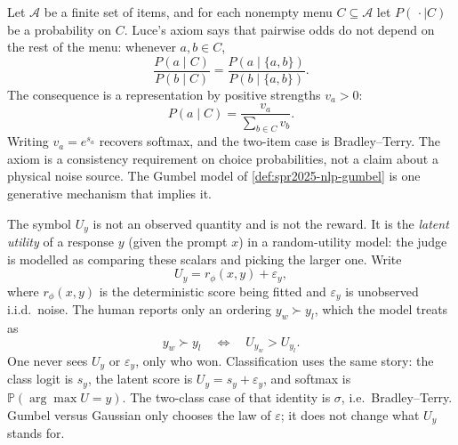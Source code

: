 \documentclass[11pt,a4paper]{article}
\theoremstyle{definition}
\begin{document}
\begin{definition}\label{def:spr2025-nlp-luce}
Let \(\mathcal{A}\) be a finite set of items, and for each nonempty menu \(C\subseteq\mathcal{A}\) let \(P(\,\cdot\mid C)\) be a probability on \(C\). Luce's axiom says that pairwise odds do not depend on the rest of the menu: whenever \(a,b\in C\),
\[
\frac{P(a\mid C)}{P(b\mid C)}
=\frac{P(a\mid\{a,b\})}{P(b\mid\{a,b\})}.
\]
The consequence is a representation by positive strengths \(v_a>0\):
\[
P(a\mid C)
=\frac{v_a}{\sum_{b\in C}v_b}.
\]
Writing \(v_a=e^{s_a}\) recovers softmax, and the two-item case is Bradley--Terry. The axiom is a consistency requirement on choice probabilities, not a claim about a physical noise source. The Gumbel model of \cref{def:spr2025-nlp-gumbel} is one generative mechanism that implies it.
\end{definition}

\begin{remark}[What \(U_y\) is]\label{rem:spr2025-nlp-latent-utility}
The symbol \(U_y\) is not an observed quantity and is not the reward. It is the \emph{latent utility} of a response \(y\) (given the prompt \(x\)) in a random-utility model: the judge is modelled as comparing these scalars and picking the larger one. Write
\[
U_y
= r_\phi(x,y)+\varepsilon_y,
\]
where \(r_\phi(x,y)\) is the deterministic score being fitted and \(\varepsilon_y\) is unobserved i.i.d.\ noise. The human reports only an ordering \(y_w\succ y_l\), which the model treats as
\[
y_w\succ y_l
\quad\Longleftrightarrow\quad
U_{y_w}>U_{y_l}.
\]
One never sees \(U_y\) or \(\varepsilon_y\), only who won. Classification uses the same story: the class logit is \(s_y\), the latent score is \(U_y=s_y+\varepsilon_y\), and softmax is \(\mathbb{P}(\arg\max U=y)\). The two-class case of that identity is \(\sigma\), i.e.\ Bradley--Terry. Gumbel versus Gaussian only chooses the law of \(\varepsilon\); it does not change what \(U_y\) stands for.
\end{remark}
\end{document}
